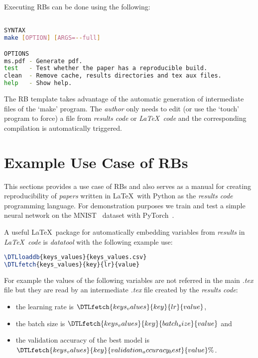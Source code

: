 \documentclass[journal]{IEEEtran}
\begin{document}
Executing RBs can be done using the following:
\begin{lstlisting}[language=Bash, style=lststyle, caption={Makefile call syntax from the shell.}, captionpos=b]

SYNTAX
make [OPTION] [ARGS=--full]

OPTIONS
ms.pdf - Generate pdf.
test   - Test whether the paper has a reproducible build.
clean  - Remove cache, results directories and tex aux files.
help   - Show help.

\end{lstlisting}

The RB template takes advantage of the automatic generation of intermediate files of the `make' program.
The \textit{author} only needs to edit (or use the `touch' program to force) a file from \textit{results code} or \textit{\LaTeX\ code} and the corresponding compilation is automatically triggered.

\section{Example Use Case of RBs}
This sections provides a use case of RBs and also serves as a manual for creating reproducibility of \textit{papers} written in \LaTeX\ with Python as the \textit{results code} programming language.
For demonstration purposes we train and test a simple neural network on the MNIST~\cite{lecun2010mnist} dataset with PyTorch~\cite{paszke2019pytorch}.

A useful \LaTeX\ package for automatically embedding variables from \textit{results} in \textit{\LaTeX\ code} is \textit{datatool} with the following example use:
\begin{lstlisting}[language=TeX, style=lststyle, caption={\LaTeX\ datatool example of loading a file that contains pairs of keys and values (keys\_values.csv) generated by a \textit{results code} and getting the value of a key named lr.}, captionpos=b]
\DTLloaddb{keys_values}{keys_values.csv}
\DTLfetch{keys_values}{key}{lr}{value}
\end{lstlisting}

For example the values of the following variables are not referred in the main \textit{.tex} file but they are read by an intermediate \textit{.tex} file created by the \textit{results code}:
\begin{itemize}
	\item the learning rate is $\DTLfetch{keys_values}{key}{lr}{value}$,
	\item the batch size is $\DTLfetch{keys_values}{key}{batch_size}{value}$ and
	\item the validation accuracy of the best model is $\DTLfetch{keys_values}{key}{validation_accuracy_best}{value}\%$.
\end{itemize}
\end{document}
